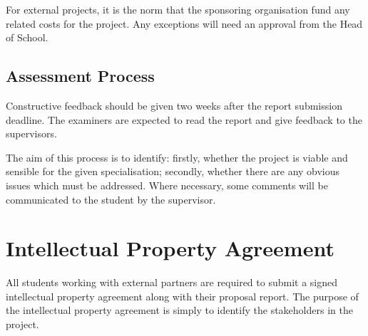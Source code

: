 For external projects, it is the norm that the sponsoring organisation fund any related costs for the project. Any exceptions will need an approval from the Head of School.

\subsection{Assessment Process}

{Constructive feedback should be given two weeks after the report submission deadline.  The examiners are expected to read the report and give feedback to the supervisors.}

The aim of this process is to identify:
firstly, whether the project is viable and sensible for the given
specialisation; secondly, whether there are any obvious issues which
must be addressed.  Where necessary, some comments will be communicated
to the student by the supervisor.

\section{Intellectual Property Agreement}

All students working with external partners are required to submit a signed intellectual property agreement along with their {proposal report}.  The purpose of the intellectual property agreement is simply to identify the stakeholders in the project.
